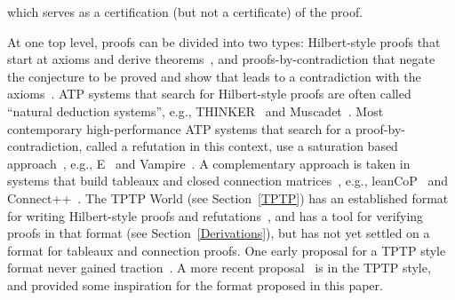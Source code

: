 \documentclass[runningheads]{llncs}
\begin{document}
which serves as a certification (but not a certificate) of the proof.
%  

At one top level, proofs can be divided into two types: Hilbert-style proofs that start at
axioms and derive theorems~\cite{End72}, and proofs-by-contradiction that negate the
conjecture to be proved and show that leads to a contradiction with the axioms~\cite{Men87}.
ATP systems that search for Hilbert-style proofs are often called ``natural deduction systems'',
e.g., THINKER~\cite{Pel98} and Muscadet~\cite{Pas01-IJCAR}.
Most contemporary high-performance ATP systems that search for a proof-by-contradiction, called
a refutation in this context, use a saturation based approach~\cite{Sch06}, e.g., E~\cite{SCV19} 
and Vampire~\cite{KV13}.
A complementary approach is taken in systems that build tableaux and closed connection 
matrices~\cite{FB+98}, e.g., leanCoP~\cite{Ott23} and Connect++~\cite{Hol23}.
The TPTP World (see Section~\ref{TPTP}) has an established format for writing Hilbert-style proofs 
and refutations~\cite{SS+06}, and has a tool for verifying proofs in that format (see
Section~\ref{Derivations}), but has not yet settled on a format for tableaux and connection
proofs.
One early proposal for a TPTP style format never gained traction~\cite{OS10}.
A more recent proposal~\cite{OH23} is in the TPTP style, and provided some inspiration for
the format proposed in this paper.
\end{document}
